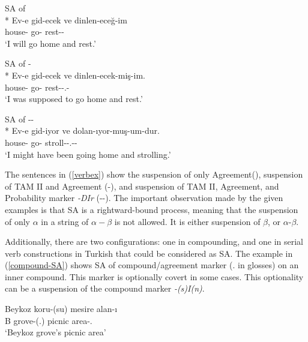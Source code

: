 \begin{exe}
    \ex \label{verbex}
    \begin{xlist}
        \ex SA of {\Fsg}\\*
        \gll Ev-e gid-ecek ve dinlen-eceğ-im \\ 
        house-{\Dat} go-{\Fut} {\And} rest-{\Fut}-{\Fsg} \\
        \glt `I will go home and rest.'
        
        \ex SA of {\Evi-\Fsg}\\*
        \gll 
        Ev-e gid-ecek ve dinlen-ecek-miş-im. \\ 
        house-{\Dat} go-{\Fut} {\And} rest-{\Fut}-{\Cop}.{\Evi}-{\Fsg} \\
        \glt  `I was supposed to go home and rest.'
        
        \ex SA of {\Evi-\Fsg-\Prob}\\*
        \gll Ev-e gid-iyor ve dolan-ıyor-muş-um-dur. \\ 
        house-{\Dat} go-{\Fut} {\And} stroll-{\Prog}-{\Cop}.{\Evi}-{\Fsg}-{\Prob} \\
        \glt `I might have been going home and strolling.'
    \end{xlist}
\end{exe}

The sentences in (\ref{verbex}) show the suspension of only Agreement(\Fsg), suspension of TAM II and Agreement (\Evi-\Fsg), and suspension of TAM II, Agreement, and Probability marker \textit{-DIr} (\Evi-\Fsg-\Prob). The important observation made by the given examples is that SA is a rightward-bound process, meaning that the suspension of only $\alpha$ in a string of $\alpha-\beta$ is not allowed. It is either suspension of $\beta$, or $\alpha$-$\beta$.

Additionally, there are two configurations: one in compounding, and one in serial verb constructions in Turkish that could be considered as SA. The example in (\ref{compound-SA}) shows SA of compound/agreement marker ({\Poss}.{\Tsg} in glosses) on an inner compound. This marker is optionally covert in some cases. This optionality can be a suspension of the compound marker \textit{-(s)I(n)}.

\begin{exe}
    \ex \label{compound-SA}
    \gll Beykoz koru-(su) mesire alan-ı \\ 
    B grove-({\Poss}.{\Tsg}) picnic area-{\Poss}.{\Tsg} \\
    \glt `Beykoz grove's picnic area'
 \end{exe}
 
